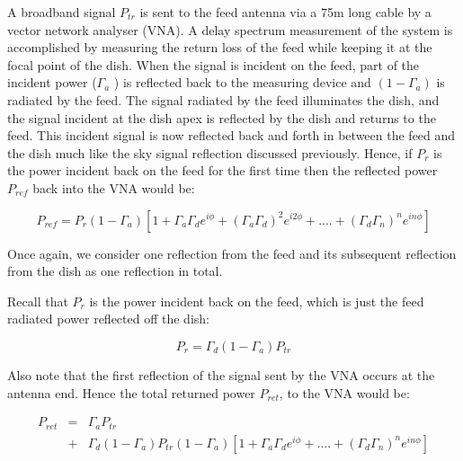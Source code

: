 \documentclass[12pt,preprint]{aastex}
\begin{document}
%

A broadband signal $P_{tr}$ is sent to the feed antenna via a 75m long cable by
a vector network analyser (VNA). A delay spectrum measurement of the system is
accomplished by measuring the return loss of the feed while keeping it at the
focal point of the dish.  When the signal is incident on the feed, part of the
incident power ($\Gamma_{a}$ ) is reflected back to the measuring device and
$(1-\Gamma_{a})$ is radiated by the feed. The signal radiated by the feed
illuminates the dish, and the signal incident at the dish apex is reflected by
the dish and returns to the feed. This incident signal is now reflected back
and forth in between the feed and the dish much like the sky signal reflection
discussed previously. Hence, if $P_{r}$ is the power incident back on the feed
for the first time then the reflected power $P_{ref}$ back into the VNA would
be:

\begin{equation}
P_{ref} =  P_{r}(1-\Gamma_{a}) [1+ \Gamma_{a}\Gamma_{d} e^{i\phi}+ (\Gamma_{a}\Gamma_{d})^2e^{i2\phi}+ ....+ (\Gamma_{d}\Gamma_{n})^{n}e^{in\phi}]
\end{equation}
 
Once again, we consider one reflection from the feed and its subsequent reflection from the dish as one reflection in total.

Recall that $P_{r}$ is the power incident back on the feed, which is just the feed radiated power reflected off the dish:
 
\begin{equation}
P_{r}= \Gamma_{d}(1-\Gamma_a) P_{tr}
\end{equation}

Also note that the first reflection of the signal sent by the VNA occurs at the antenna end. Hence the total returned power $P_{ret}$, to the VNA  would be:

\begin{eqnarray}
P_{ret} & = & \Gamma_{a}P_{tr} \nonumber\\ 
 & + &   \Gamma_{d}(1-\Gamma_a) P_{tr}(1-\Gamma_{a}) [1+ \Gamma_{a}\Gamma_{d} e^{i\phi}+  ....+ (\Gamma_{d}\Gamma_{n})^{n}e^{in\phi}]\nonumber\\
 \end{eqnarray}
 
\end{document}
